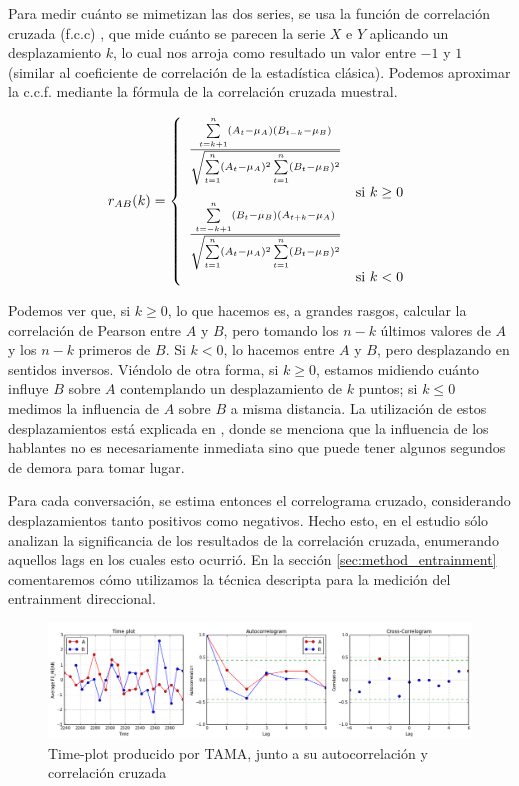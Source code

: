 Para medir cuánto se mimetizan las dos series, se usa la función de correlación cruzada (f.c.c) \cite{CHATFIELD}, que mide cuánto se parecen la serie $X$ e $Y$ aplicando un desplazamiento $k$, lo cual nos arroja como resultado un valor entre $-1$ y $1$ (similar al coeficiente de correlación de la estadística clásica). Podemos aproximar la c.c.f. mediante la fórmula de la correlación cruzada muestral.

\begin{equation}
  \label{cross_correlation_definition}
  r_{AB}(k) =
  \left\{
    \begin{array}{ll}
      \frac{\sum\limits_{t=k+1}^n (A_t - \mu_{A}) (B_{t-k} - \mu_{B})}{\sqrt{\sum\limits_{t=1}^n (A_t - \mu_{A})^2\sum\limits_{t=1}^n (B_t - \mu_{B})^2}} \\ & \mbox{si } k \geq 0 \\
      \frac{\sum\limits_{t=-k+1}^n (B_t - \mu_{B}) (A_{t+k} - \mu_{A})}{\sqrt{\sum\limits_{t=1}^n (A_t - \mu_{A})^2\sum\limits_{t=1}^n (B_t - \mu_{B})^2}} \\  & \mbox{si } k < 0
    \end{array}
  \right.
\end{equation}

Podemos ver que, si $k \geq 0$, lo que hacemos es, a grandes rasgos, calcular la correlación de Pearson entre $A$ y $B$, pero tomando los $n-k$ últimos valores de $A$ y los $n-k$ primeros de $B$. Si $k < 0$, lo hacemos entre $A$ y $B$, pero desplazando en sentidos inversos. Viéndolo de otra forma, si $k \geq 0$, estamos midiendo cuánto influye $B$ sobre $A$ contemplando un desplazamiento de $k$ puntos; si $k \leq 0$ medimos la influencia de $A$ sobre $B$ a misma distancia. La utilización de estos desplazamientos está explicada en \cite{gravano2015backward}, donde se menciona que la influencia de los hablantes no es necesariamente inmediata sino que puede tener algunos segundos de demora para tomar lugar. 

Para cada conversación, se estima entonces el correlograma cruzado, considerando desplazamientos tanto positivos como negativos. Hecho esto, en el estudio \cite{KOU2008.2} sólo analizan la significancia de los resultados de la correlación cruzada, enumerando aquellos lags en los cuales esto ocurrió. En la sección \ref{sec:method_entrainment} comentaremos cómo utilizamos la técnica descripta para la medición del entrainment direccional.

\begin{figure}[b]
\centering
\includegraphics[width=\textwidth]{images/time_plot_with_cross_correlation.png}
\caption{Time-plot producido por TAMA, junto a su autocorrelación y correlación cruzada}
\end{figure}


